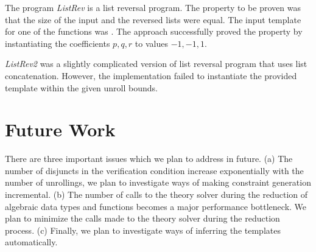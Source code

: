 \documentclass[a4paper,10pt]{article}
\begin{document}
The program \emph{ListRev} is a list reversal program. The property to be proven was that the size of the 
input and the reversed lists were equal. The input template for one of the functions was
. 
The approach successfully proved the property by instantiating the coefficients $p,q,r$ to values $-1,-1,1$.

\emph{ListRev2} was a slightly complicated version of list reversal program that uses list concatenation.
However, the implementation failed to instantiate the provided template within the given unroll bounds.

\section{Future Work}

There are three important issues which we plan to address in future. (a) The number of disjuncts in the 
verification condition increase exponentially with the number of unrollings, we plan to investigate ways of making constraint generation incremental.
(b) The number of calls to the theory solver during the reduction of algebraic data types and functions 
becomes a major performance bottleneck. We plan to minimize the calls made to the theory solver during the reduction process.
(c) Finally, we plan to investigate ways of inferring the templates automatically.

%
%
\end{document}
